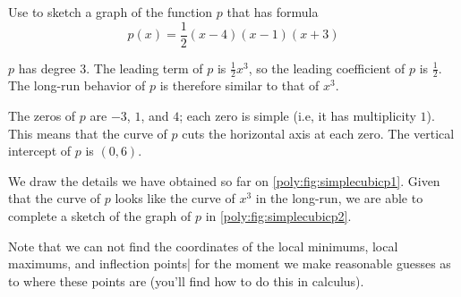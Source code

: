 \begin{pccexample}\label{poly:ex:simplecubic}
Use  to sketch a graph of the function $p$ 
that has formula
\[
    p(x)=\frac{1}{2}(x-4)(x-1)(x+3)
\]
\begin{pccsolution}
    \begin{steps}
        \item $p$ has degree $3$. The leading term of $p$ is $\frac{1}{2}x^3$, so the leading coefficient of $p$ 
         is $\frac{1}{2}$. The long-run behavior of $p$ is therefore similar to that of $x^3$.
        \item The zeros of $p$ are $-3$, $1$, and $4$; each zero is simple (i.e, it has multiplicity $1$).
         This means that the curve of $p$ cuts the horizontal axis at each zero. The vertical 
         intercept of $p$ is $(0,6)$.
        \item We draw the details we have obtained so far on \cref{poly:fig:simplecubicp1}. Given 
         that the curve of $p$ looks like the curve of $x^3$ in the long-run, we are able to complete a sketch of the 
         graph of $p$ in \cref{poly:fig:simplecubicp2}.

         Note that we can not find the coordinates of the local minimums, local maximums, and inflection
         points| for the moment we make reasonable guesses as to where these points are (you'll find how
         to do this in calculus).
    \end{steps}


\end{pccsolution}
\end{pccexample}
